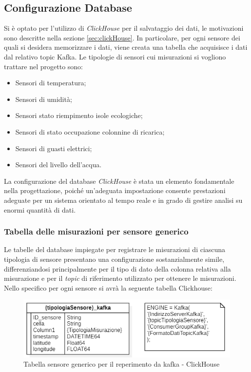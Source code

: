 \subsection{Configurazione Database}
Si è optato per l'utilizzo di \textit{ClickHouse} per il salvataggio dei dati, le motivazioni sono descritte nella sezione \ref{sec:clickHouse}. In particolare, per ogni sensore dei quali si desidera memorizzare i dati, viene creata una tabella che acquisisce i dati dal relativo topic Kafka.
Le tipologie di sensori cui misurazioni si vogliono trattare nel progetto sono:
\begin{itemize}
    \item Sensori di temperatura;
    \item Sensori di umidità;
    \item Sensori stato riempimento isole ecologiche;
    \item Sensori di stato occupazione colonnine di ricarica;
    \item Sensori di guasti elettrici;
    \item Sensori del livello dell'acqua.
\end{itemize}

La configurazione del database \textit{ClickHouse} è stata un elemento fondamentale nella progettazione, poiché un'adeguata impostazione consente prestazioni adeguate per un sistema orientato al tempo reale e in grado di gestire analisi su enormi quantità di dati.

\subsubsection{Tabella delle misurazioni per sensore generico}
Le tabelle del database impiegate per registrare le misurazioni di ciascuna tipologia di sensore presentano una configurazione sostanzialmente simile, differenziandosi principalmente per il tipo di dato della colonna relativa alla misurazione e per il \textit{topic} di riferimento utilizzato per ottenere le misurazioni.
Nello specifico per ogni sensore si avrà la seguente tabella Clickhouse:
\begin{figure}[H]
    \centering
    \includegraphics[width=.6\textwidth]{../Images/SpecificaTecnica/sensorType_kafka.PNG}
    \caption{Tabella sensore generico per il reperimento da kafka - ClickHouse}
    \label{fig:sensorKafka}
  \end{figure}

